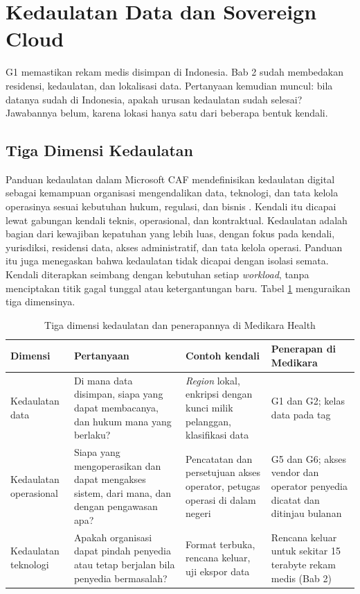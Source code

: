\section{Kedaulatan Data dan Sovereign Cloud}
\label{sec:ch14-kedaulatan}

G1 memastikan rekam medis disimpan di Indonesia. Bab 2 sudah membedakan residensi, kedaulatan, dan
lokalisasi data. Pertanyaan kemudian muncul: bila datanya sudah di Indonesia, apakah urusan
kedaulatan sudah selesai? Jawabannya belum, karena lokasi hanya satu dari beberapa bentuk kendali.

\subsection{Tiga Dimensi Kedaulatan}

Panduan kedaulatan dalam Microsoft CAF mendefinisikan kedaulatan digital sebagai kemampuan
organisasi mengendalikan data, teknologi, dan tata kelola operasinya sesuai kebutuhan hukum,
regulasi, dan bisnis \cite{c14-azure-sovereignty}. Kendali itu dicapai lewat gabungan kendali
teknis, operasional, dan kontraktual. Kedaulatan adalah bagian dari kewajiban kepatuhan yang lebih
luas, dengan fokus pada kendali, yurisdiksi, residensi data, akses administratif, dan tata kelola
operasi. Panduan itu juga menegaskan bahwa kedaulatan tidak dicapai dengan isolasi semata. Kendali
diterapkan seimbang dengan kebutuhan setiap \textit{workload}, tanpa menciptakan titik gagal tunggal
atau ketergantungan baru. Tabel \ref{tab:ch14-dimensi-kedaulatan} menguraikan tiga dimensinya.

\begin{table}[!htb]
  \centering
  \caption{Tiga dimensi kedaulatan dan penerapannya di Medikara Health}
  \label{tab:ch14-dimensi-kedaulatan}
  \footnotesize
  \begin{tabularx}{\textwidth}{>{\raggedright\arraybackslash}p{2.0cm}
      >{\raggedright\arraybackslash}X >{\raggedright\arraybackslash}X
      >{\raggedright\arraybackslash}X}
    \hline
    \textbf{Dimensi} & \textbf{Pertanyaan} & \textbf{Contoh kendali} & \textbf{Penerapan di
      Medikara} \\ \hline
    Kedaulatan data & Di mana data disimpan, siapa yang dapat membacanya, dan hukum mana yang
      berlaku? & \textit{Region} lokal, enkripsi dengan kunci milik pelanggan, klasifikasi data &
      G1 dan G2; kelas data pada tag \\ \hline
    Kedaulatan operasional & Siapa yang mengoperasikan dan dapat mengakses sistem, dari mana, dan
      dengan pengawasan apa? & Pencatatan dan persetujuan akses operator, petugas operasi di dalam
      negeri & G5 dan G6; akses vendor dan operator penyedia dicatat dan ditinjau bulanan \\ \hline
    Kedaulatan teknologi & Apakah organisasi dapat pindah penyedia atau tetap berjalan bila
      penyedia bermasalah? & Format terbuka, rencana keluar, uji ekspor data & Rencana keluar untuk
      sekitar 15 terabyte rekam medis (Bab 2) \\ \hline
  \end{tabularx}
\end{table}


